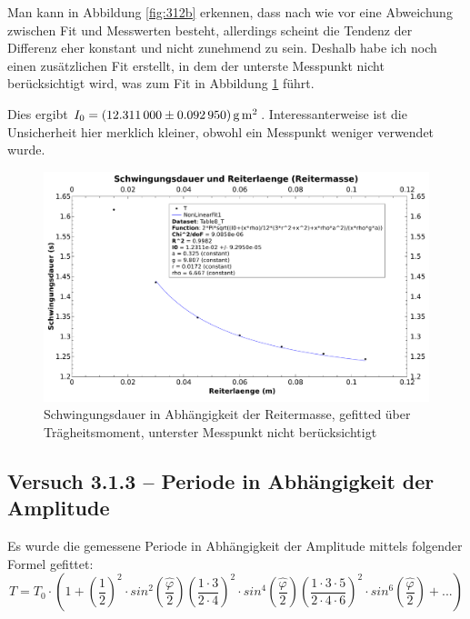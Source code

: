 \clearpage
Man  kann  in  Abbildung  \ref{fig:312b}  erkennen, dass  nach  wie  vor  eine
Abweichung zwischen Fit und Messwerten besteht, allerdings scheint die Tendenz
der Differenz eher konstant und nicht zunehmend zu sein. Deshalb habe ich noch
einen  zus\"atzlichen  Fit  erstellt,  in dem  der  unterste  Messpunkt  nicht
ber\"ucksichtigt wird, was zum Fit in Abbildung \ref{fig:312c} f\"uhrt.

Dies ergibt
$I_0  = \SI[separate-uncertainty = true]{12.311 \pm 0.092950}{\gram\meter\squared}$.
Interessanterweise  ist die  Unsicherheit  hier merklich  kleiner, obwohl  ein
Messpunkt weniger verwendet wurde.

\begin{figure}[h!]
    \centering
    \includegraphics[width=\textwidth]{images/312c.pdf}
    \caption{%
        Schwingungsdauer in Abh\"angigkeit der Reitermasse, gefitted \"uber Tr\"agheitsmoment, unterster Messpunkt nicht ber\"ucksichtigt
    }
    \label{fig:312c}
\end{figure}

\clearpage
\subsection{Versuch 3.1.3 -- Periode in Abh\"angigkeit der Amplitude}
\label{subsec:periodeAmplitude}

Es wurde die gemessene Periode in Abh\"angigkeit der Amplitude mittels folgender
Formel gefittet:
\begin{equation}
    T = T_0 \cdot
        \left(
            1 +
            \left( \frac{1}{2} \right)^2 \cdot sin^2 \left( \frac{\hat{\varphi}}{2} \right)
            \left( \frac{1 \cdot 3}{2 \cdot 4} \right)^2 \cdot sin^4 \left( \frac{\hat{\varphi}}{2} \right)
            \left( \frac{1 \cdot 3 \cdot 5}{2 \cdot 4 \cdot 6} \right)^2 \cdot sin^6 \left( \frac{\hat{\varphi}}{2} \right)
            + ...
        \right)
\end{equation}

